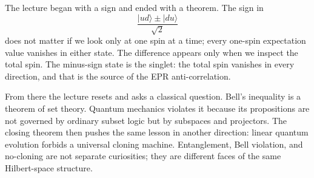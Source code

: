The lecture began with a sign and ended with a theorem. The sign in
\[
\frac{|ud\rangle\pm|du\rangle}{\sqrt{2}}
\]
does not matter if we look only at one spin at a time; every one-spin expectation value vanishes in either state. The difference appears only when we inspect the total spin. The minus-sign state is the singlet: the total spin vanishes in every direction, and that is the source of the EPR anti-correlation.

From there the lecture resets and asks a classical question. Bell's inequality is a theorem of set theory. Quantum mechanics violates it because its propositions are not governed by ordinary subset logic but by subspaces and projectors. The closing theorem then pushes the same lesson in another direction: linear quantum evolution forbids a universal cloning machine. Entanglement, Bell violation, and no-cloning are not separate curiosities; they are different faces of the same Hilbert-space structure.